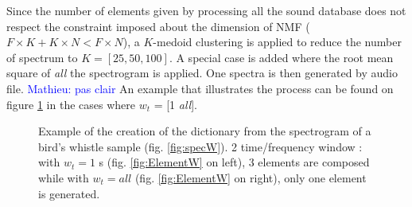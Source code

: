 \documentclass[twocolumn,a4paper,10pt]{article}
\newcommand{\ml}[1]{\textcolor{blue}{ Mathieu: #1}}
\begin{document}
Since the number of elements given by processing all the sound database does not respect the constraint imposed about the dimension of NMF ($F \times K + K \times N < F \times N$), a $K$-medoid clustering is applied to reduce the number of spectrum to $K = \left[ 25, 50, 100 \right]$. A special case is added where the root mean square of \textit{all} the spectrogram is applied. One spectra is then generated by audio file. \ml{pas clair}
An example that illustrates the process can be found on figure \ref{fig:dictionaryExtraction} in the cases where $w_t$ = [1 \textit{all}].

\begin{figure}
    \centering
\begin{minipage}[t]{\linewidth}
    
    \caption{Example of the creation of the dictionary from the spectrogram of a bird's whistle sample (fig. \ref{fig:specW}). 2 time/frequency window :  with $w_t = 1$ s (fig. \ref{fig:ElementW} on left), 3 elements are composed while with $w_t = all$ (fig. \ref{fig:ElementW} on right), only one element is generated.}
    \label{fig:dictionaryExtraction}
    \end{minipage}
\end{figure}
\end{document}
